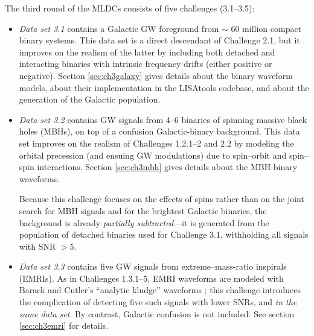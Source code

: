 \documentclass{iopart}
\begin{document}
The third round of the MLDCs consists of five challenges (3.1--3.5):
%
\begin{itemize}
%
\item \textit{Data set 3.1} contains a Galactic GW foreground from $\sim$ 60 million compact binary systems.
This data set is a direct descendant of Challenge 2.1, but it improves on the realism of the latter by including both detached and interacting binaries with intrinsic frequency drifts (either positive or negative). Section \ref{sec:ch3galaxy} gives details about the binary waveform models, about their implementation in the LISAtools codebase, and about the generation of the Galactic population. 
%
\item \textit{Data set 3.2} contains GW signals from 4--6 binaries of spinning massive black holes (MBHs), on top of a confusion Galactic-binary background. This data set improves on the realism of Challenges 1.2.1--2 and 2.2 by modeling the orbital precession (and ensuing GW modulations) due to spin--orbit and spin--spin interactions. Section \ref{sec:ch3mbh} gives details about the MBH-binary waveforms.

Because this challenge focuses on the effects of spins rather than on the joint search for MBH signals and for the brightest Galactic binaries, the background is already \emph{partially subtracted}---it is generated from the population of detached binaries used for Challenge 3.1, withholding all signals with SNR $> 5$.
%
\item \textit{Data set 3.3} contains five GW signals from extreme--mass-ratio inspirals (EMRIs). As in Challenges 1.3.1--5, EMRI waveforms are modeled with Barack and Cutler's ``analytic kludge'' waveforms \cite{barackcutler}; this challenge introduces the complication of detecting five such signals with lower SNRs, and \emph{in the same data set}. By contrast, Galactic confusion is not included. See section \ref{sec:ch3emri} for details.
%
\end{itemize}
%
\end{document}
